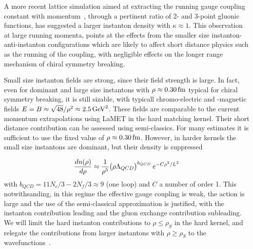\documentclass[11pt,aps,amsmath,amssymb,nofootinbib,notitlepage,longbibliography]{revtex4-1}
\begin{document}
A more recent lattice simulation aimed at extracting the running gauge coupling constant with momentum~\cite{Athenodorou:2018jwu},
through a pertinent  ratio of 2- and 3-point gluonic functions, has suggested a larger instanton density with
$\kappa\approx 1$. This observation at large running momenta, points at the effects from the smaller
size instanton-anti-instanton configurations which are likely to affect short distance physics such as the running
of the coupling, with negligible effects on the longer range mechanism of chiral symmetry breaking.



Small size instanton fields are strong, since their field strength  is large.
In fact, even for dominant and large  size instantons  with $\rho\approx 0.30\, {\rm fm}$ typical for chiral symmetry breaking,
it is still sizable, with typicall chromo-electric and -magnetic fields $E=B\approx \sqrt{48}/\rho^2\approx 2.5\,{\rm GeV}^2$.
These fields are
%
 comparable to the current momentum extrapolations using LaMET in the hard matching kernel. Their
short distance contribution can be assessed using semi-classics.
For many estimates it is sufficient to use  the fixed  value of $\rho\approx 0.30\, {\rm fm}$. However,  in harder kernels
the small size instantons are dominant, but their density is suppressed~\cite{Hasenfratz:1999ng,Shuryak:1999fe}

\begin{equation}
\label{dn_dist}
\frac{dn(\rho)}{d\rho} \approx   {1 \over \rho^5}\big(\rho \Lambda_{QCD} \big)^{b_{QCD}} \, e^{- C\rho^2/L^2}
\end{equation}
with $b_{QCD}=11N_c/3-2N_f/3\approx 9$ (one loop) and  $C$ a number of order 1.
 This notwithsanding, in this regime the effective gauge coupling is weak, the action is
large and the use of the semi-classical approximation is justified, with the instanton contribution leading and the gluon
exchange contribution subleading. We will limit the hard instanton contributions to $\rho\leq \rho_S$ in the hard kernel, and relegate
the contributions from larger instantons with $\rho\geq \rho_S$ to the wavefunctions~\cite{Kock:2020frx}.
\end{document}
